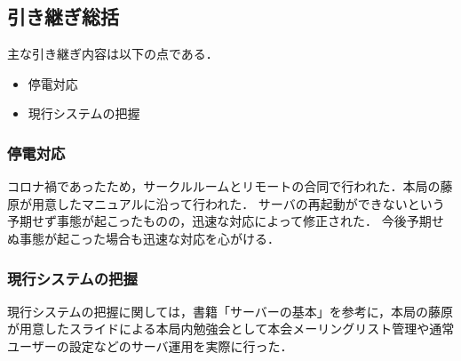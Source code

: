 \subsection*{引き継ぎ総括}


主な引き継ぎ内容は以下の点である．
\begin{itemize}
	\item 停電対応
	\item 現行システムの把握
\end{itemize}

\subsubsection*{停電対応}
コロナ禍であったため，サークルルームとリモートの合同で行われた．本局の藤原が用意したマニュアルに沿って行われた．
サーバの再起動ができないという予期せず事態が起こったものの，迅速な対応によって修正された．
今後予期せぬ事態が起こった場合も迅速な対応を心がける．

\subsubsection*{現行システムの把握}
現行システムの把握に関しては，書籍「サーバーの基本」を参考に，本局の藤原が用意したスライドによる本局内勉強会として本会メーリングリスト管理や通常ユーザーの設定などのサーバ運用を実際に行った．

